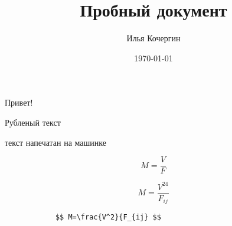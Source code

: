 \documentclass[a4paper]{article}
\author{Илья Кочергин}
\title{Пробный документ}
\date{\today}
\begin{document}
  \maketitle
  
  Привет!
  
  {
    \sffamily
    Рубленый текст	
  }
  
  {\ttfamily
  текст напечатан на машинке	
  }
  


  
  \[ M=\frac{V}{F} \]
  
 $$ M=\frac{V^{24}}{F_{ij}} $$
 			
 
    	\begin{verbatim}
    		$$ M=\frac{V^2}{F_{ij} $$
    	\end{verbatim}  
\end{document}
